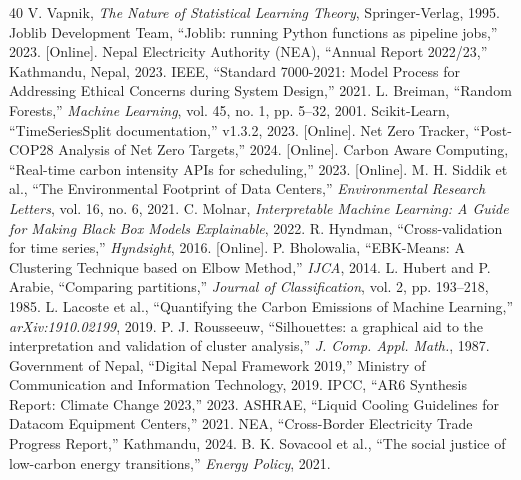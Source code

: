 \documentclass[conference]{IEEEtran}
\begin{document}
\begin{thebibliography}{40}
 V. Vapnik, \textit{The Nature of Statistical Learning Theory}, Springer-Verlag, 1995.
 Joblib Development Team, ``Joblib: running Python functions as pipeline jobs,'' 2023. [Online].
 Nepal Electricity Authority (NEA), ``Annual Report 2022/23,'' Kathmandu, Nepal, 2023.
 IEEE, ``Standard 7000-2021: Model Process for Addressing Ethical Concerns during System Design,'' 2021.
 L. Breiman, ``Random Forests,'' \textit{Machine Learning}, vol. 45, no. 1, pp. 5–32, 2001.
 Scikit-Learn, ``TimeSeriesSplit documentation,'' v1.3.2, 2023. [Online].
 Net Zero Tracker, ``Post-COP28 Analysis of Net Zero Targets,'' 2024. [Online].
 Carbon Aware Computing, ``Real-time carbon intensity APIs for scheduling,'' 2023. [Online].
 M. H. Siddik et al., ``The Environmental Footprint of Data Centers,'' \textit{Environmental Research Letters}, vol. 16, no. 6, 2021.
 C. Molnar, \textit{Interpretable Machine Learning: A Guide for Making Black Box Models Explainable}, 2022.
 R. Hyndman, ``Cross-validation for time series,'' \textit{Hyndsight}, 2016. [Online].
 P. Bholowalia, ``EBK-Means: A Clustering Technique based on Elbow Method,'' \textit{IJCA}, 2014.
 L. Hubert and P. Arabie, ``Comparing partitions,'' \textit{Journal of Classification}, vol. 2, pp. 193–218, 1985.
 L. Lacoste et al., ``Quantifying the Carbon Emissions of Machine Learning,'' \textit{arXiv:1910.02199}, 2019.
 P. J. Rousseeuw, ``Silhouettes: a graphical aid to the interpretation and validation of cluster analysis,'' \textit{J. Comp. Appl. Math.}, 1987.
 Government of Nepal, ``Digital Nepal Framework 2019,'' Ministry of Communication and Information Technology, 2019.
 IPCC, ``AR6 Synthesis Report: Climate Change 2023,'' 2023.
 ASHRAE, ``Liquid Cooling Guidelines for Datacom Equipment Centers,'' 2021.
 NEA, ``Cross-Border Electricity Trade Progress Report,'' Kathmandu, 2024.
 B. K. Sovacool et al., ``The social justice of low-carbon energy transitions,'' \textit{Energy Policy}, 2021.
\end{thebibliography}
\end{document}
